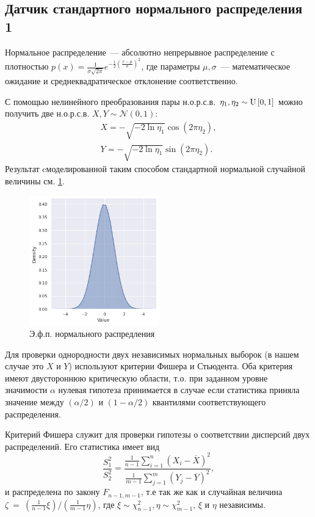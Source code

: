 \subsection{Датчик стандартного нормального распределения 1} \label{3.4}
    Нормальное распределение~--- абсолютно непрерывное распределение с 
    плотностью $p(x) = \frac{1}{\sigma \sqrt{2\pi}} 
    e^{-\frac{1}{2}(\frac{x-\mu}{\sigma})^2}$, где параметры $\mu, \sigma$~--- 
    математическое ожидание и среднеквадратическое отклонение соответственно.

    С помощью нелинейного преобразования пары н.о.р.с.в. $\eta_1, \eta_2 \sim 
    \mathrm{U}\left[0,1\right]$ можно получить две н.о.р.с.в. $X,Y \sim \mathcal{N}(0,1)$:
    \begin{gather*}
        X = -\sqrt{-2\ln\eta_1}\cos(2\pi\eta_2),\\  
        Y = -\sqrt{-2\ln\eta_1}\sin(2\pi\eta_2). 
    \end{gather*}
    Результат cмоделированной таким способом стандартной нормальной случайной 
    величины см. \ref{task3_norm}.

    \begin{figure}[tbp]
        \centering
        \includegraphics[width=0.5\textwidth]{resources/task3_norm.png}
        \caption{Э.ф.п. нормального распредления}
        \label{task3_norm}
    \end{figure}


    Для проверки однородности двух независимых нормальных выборок (в нашем 
    случае это $X$ и $Y$) используют критерии Фишера и Стьюдента. Оба критерия 
    имеют двустороннюю критическую области, т.о. при заданном уровне значимости 
    $\alpha$ нулевая гипотеза принимается в случае если статистика приняла 
    значение между $(\alpha/2)$ и $(1-\alpha/2)$ квантилями соответствующего 
    распределения.

    Критерий Фишера служит для проверки гипотезы о соответствии дисперсий 
    двух распределений. Его статистика имеет вид
    \begin{equation}\label{Fischer}
        \dfrac{S_1^2}{S_2^2} = \dfrac{\frac{1}{n-1}\sum_{i=1}^n (X_i-\overline X)^2}
        {\frac{1}{m-1}\sum_{j=1}^m (Y_j-\overline Y)^2},
    \end{equation}
    и распределена по закону $F_{n-1,m-1}$, т.е так же как и случайная величина 
    $\zeta~=~(\frac{1}{n-1}\xi)/(\frac{1}{m-1}\eta)$, где $\xi \sim \chi_{n-1}^2,
    \eta \sim \chi_{m-1}^2$, $\xi$ и $\eta$ независимы.
    
